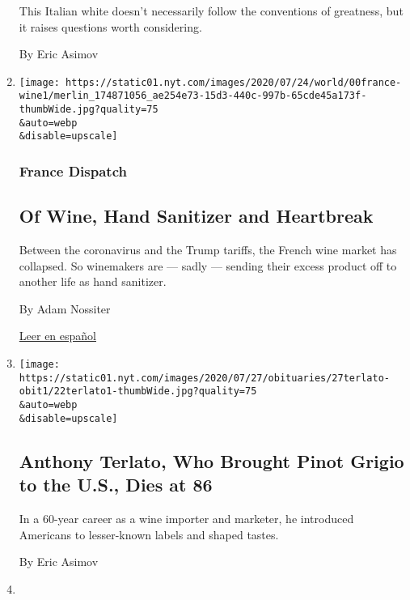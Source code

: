 \begin{enumerate}
  This Italian white doesn't necessarily follow the conventions of
  greatness, but it raises questions worth considering.

  By Eric Asimov
\item
  \href{/2020/07/27/world/europe/france-alsace-wine-coronavirus.html}{}

  \texttt{[image: https://static01.nyt.com/images/2020/07/24/world/00france-wine1/merlin\_174871056\_ae254e73-15d3-440c-997b-65cde45a173f-thumbWide.jpg?quality=75\\\&auto=webp\\\&disable=upscale]}

  \hypertarget{france-dispatch}{%
  \subsubsection{France Dispatch}\label{france-dispatch}}

  \hypertarget{of-wine-hand-sanitizer-and-heartbreak}{%
  \subsection{Of Wine, Hand Sanitizer and
  Heartbreak}\label{of-wine-hand-sanitizer-and-heartbreak}}

  Between the coronavirus and the Trump tariffs, the French wine market
  has collapsed. So winemakers are --- sadly --- sending their excess
  product off to another life as hand sanitizer.

  By Adam Nossiter

  \href{https://www.nytimes.com/es/2020/07/28/espanol/mundo/vino-blanco-alsacia-coronavirus.html}{Leer
  en español}
\item
  \href{/2020/07/23/dining/drinks/anthony-terlato-dead.html}{}

  \texttt{[image: https://static01.nyt.com/images/2020/07/27/obituaries/27terlato-obit1/22terlato1-thumbWide.jpg?quality=75\\\&auto=webp\\\&disable=upscale]}

  \hypertarget{anthony-terlato-who-brought-pinot-grigio-to-the-us-dies-at-86}{%
  \subsection{Anthony Terlato, Who Brought Pinot Grigio to the U.S.,
  Dies at
  86}\label{anthony-terlato-who-brought-pinot-grigio-to-the-us-dies-at-86}}

  In a 60-year career as a wine importer and marketer, he introduced
  Americans to lesser-known labels and shaped tastes.

  By Eric Asimov
\item
  \href{/2020/07/23/dining/drinks/best-sparkling-wines.html}{}


\end{enumerate}
